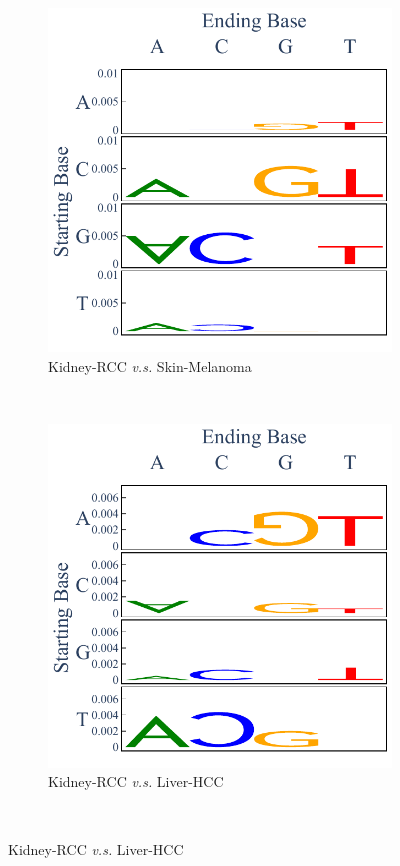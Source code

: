 \begin{figure}[ht!]
    \begin{subfigure}{.5\textwidth}
    \includegraphics[scale=0.7]{graphics/spectra_Kidney-RCC_Skin-Melanoma.pdf}
    \caption{Kidney-RCC \textit{v.s.} Skin-Melanoma}
    \label{fig:spectra_kidney_skin}
    \end{subfigure}
    ~
    \begin{subfigure}{.5\textwidth}
    \includegraphics[scale=0.7]{graphics/spectra_Kidney-RCC_Liver-HCC.pdf}
    \caption{Kidney-RCC \textit{v.s.} Liver-HCC}
    \label{fig:spectra_kidney_liver}
    \end{subfigure} \\
    \vspace{0.5cm}
    

\end{figure}
